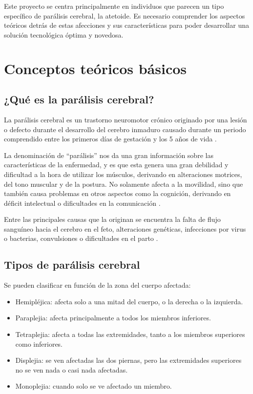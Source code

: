 


Este proyecto se centra principalmente en individuos que parecen un tipo específico de parálisis cerebral, la atetoide. Es necesario comprender los aspectos teóricos detrás de estas afecciones y sus características para poder desarrollar una solución tecnológica óptima y novedosa. 

\section{Conceptos teóricos básicos}
\subsection{¿Qué es la parálisis cerebral?}

La parálisis cerebral es un trastorno neuromotor crónico originado por una lesión o defecto durante el desarrollo del cerebro inmaduro causado durante un periodo comprendido entre los primeros días de gestación y los 5 años de vida \cite{MayoClinic2024}.

La denominación de “parálisis” nos da una gran información sobre las características de la enfermedad, y es que esta genera una gran debilidad y dificultad a la hora de utilizar los músculos, derivando en alteraciones motrices, del tono muscular y de la postura. No solamente afecta a la movilidad, sino que también causa problemas en otros aspectos como la cognición, derivando en déficit intelectual o dificultades en la comunicación \cite{GarciaRon2022, MedlinePlus2024}.

Entre las principales causas que la originan se encuentra la falta de flujo sanguíneo hacia el cerebro en el feto, alteraciones genéticas, infecciones por virus o bacterias, convulsiones o dificultades en el parto \cite{CentrodeNeurologaAvanzada2025}. 

\subsection{Tipos de parálisis cerebral}

Se pueden clasificar en función de la zona del cuerpo afectada:
\begin{itemize}
    \item Hemipléjica: afecta solo a una mitad del cuerpo, o la derecha o la izquierda.
    \item Paraplejia: afecta principalmente a todos los miembros inferiores.
    \item Tetraplejia: afecta a todas las extremidades, tanto a los miembros superiores como inferiores.
    \item Displejia: se ven afectadas las dos piernas, pero las extremidades superiores no se ven nada o casi nada afectadas.
    \item Monoplejia: cuando solo se ve afectado un miembro. 
\end{itemize}

